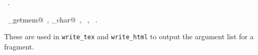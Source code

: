 \documentclass[a4paper]{report}
\begin{document}
\begin{flushleft}
\begin{minipage}{\linewidth}
\begin{list}{}{}
\mbox{}\verb@    if ( c == nw_char ) {@\\
\mbox{}\verb@      c = pop(manager);@\\
\mbox{}\verb@    }@\\
\mbox{}\verb@    *parameters = res;@\\
\mbox{}\verb@  }@\\
\mbox{}\verb@@{\NWsep}
\end{list}
\vspace{-1.5ex}
\footnotesize
\begin{list}{}{\setlength{\itemsep}{-\parsep}\setlength{\itemindent}{-\leftmargin}}
\item \NWtxtMacroRefIn\ .
\item \NWtxtIdentsUsed\nobreak\  \verb@arena_getmem@\nobreak\ , \verb@nw_char@\nobreak\ , \verb@Parameters@\nobreak\ , \verb@pop@\nobreak\ .
\item{}
\end{list}
\end{minipage}\vspace{4ex}
\end{flushleft}
These are used in \verb|write_tex| and \verb|write_html| to output the
argument list for a fragment.
\end{document}
